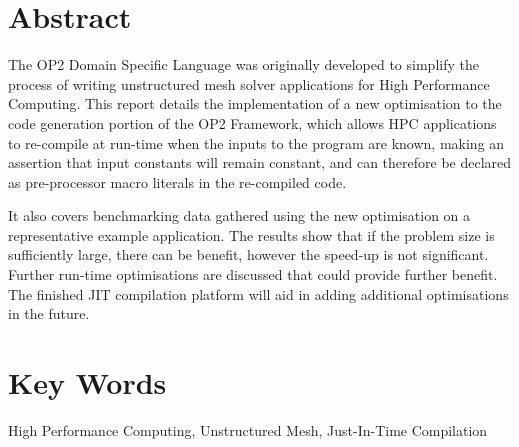 
%
\vspace*{\fill}
\begin{adjustwidth}{55pt}{55pt}

\section*{Abstract}
The OP2 Domain Specific Language was originally developed to simplify the process of writing unstructured mesh solver applications for High Performance Computing. This report details the implementation of a new optimisation to the code generation portion of the OP2 Framework, which allows HPC applications to re-compile at run-time when the inputs to the program are known, making an assertion that input constants will remain constant, and can therefore be declared as pre-processor macro literals in the re-compiled code.
\par It also covers benchmarking data gathered using the new optimisation on a representative example application. The results show that if the problem size is sufficiently large, there can be benefit, however the speed-up is not significant. Further run-time optimisations are discussed that could provide further benefit. The finished JIT compilation platform will aid in adding additional optimisations in the future.

\section*{Key Words}
High Performance Computing, Unstructured Mesh, Just-In-Time Compilation
\end{adjustwidth}
\vspace*{\fill}
